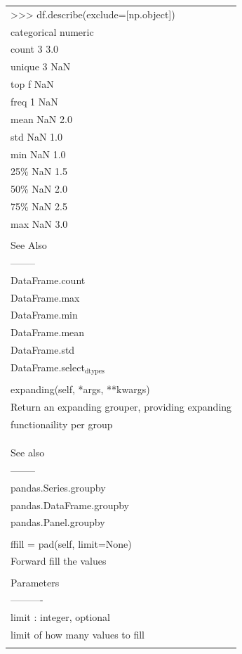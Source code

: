 \documentclass[11pt]{article}
\begin{document}
\begin{enumerate}
\begin{enumerate}
\begin{enumerate}
\begin{center}
\begin{tabular}{l}
>>> df.describe(exclude=[np.object])\\
categorical  numeric\\
count            3      3.0\\
unique           3      NaN\\
top              f      NaN\\
freq             1      NaN\\
mean           NaN      2.0\\
std            NaN      1.0\\
min            NaN      1.0\\
25\%            NaN      1.5\\
50\%            NaN      2.0\\
75\%            NaN      2.5\\
max            NaN      3.0\\
\\
See Also\\
--------\\
DataFrame.count\\
DataFrame.max\\
DataFrame.min\\
DataFrame.mean\\
DataFrame.std\\
DataFrame.select\(_{\text{dtypes}}\)\\
\\
expanding(self, *args, **kwargs)\\
Return an expanding grouper, providing expanding\\
functionaility per group\\
\\
\\
\\
See also\\
--------\\
pandas.Series.groupby\\
pandas.DataFrame.groupby\\
pandas.Panel.groupby\\
\\
ffill = pad(self, limit=None)\\
Forward fill the values\\
\\
Parameters\\
----------\\
limit : integer, optional\\
limit of how many values to fill\\
\\

\end{tabular}
\end{center}
\end{enumerate}
\end{enumerate}
\end{enumerate}
\end{document}
